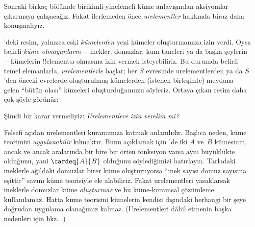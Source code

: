 \documentclass[../../../include/open-logic-section]{subfiles}
\begin{document}

Sonraki birkaç bölümde birikimli-yinelemeli küme anlayışından aksiyomlar
çıkarmaya çalışacağız. Fakat ilerlemeden önce \emph{urelementler} hakkında
biraz daha konuşmalıyız.

'deki resim, yalnızca eski \emph{kümelerden} yeni
kümeler oluşturmamıza izin verdi. Oysa belirli \emph{küme olmayanların}---
inekler, domuzlar, kum taneleri ya da başka şeylerin---kümelerin !!{element}s{}ı
olmasına izin vermek isteyebiliriz. Bu durumda belirli temel elemanlarla,
\emph{urelementlerle} başlar; her $S$ evresinde urelementlerden ya da
$S$'den önceki evrelerde oluşturulmuş kümelerden (istenen birleşimle) meydana
gelen ``bütün olası'' kümeleri oluşturduğumuzu söyleriz. Ortaya çıkan resim
daha çok şöyle görünür:
\begin{center}
\end{center}
Şimdi bir karar vermeliyiz: \emph{Urelementlere izin verelim mi?}

Felsefi açıdan urelementleri kuramımıza katmak anlamlıdır. Başlıca neden,
küme teorimizi \emph{uygulanabilir} kılmaktır. Bunu açıklamak için
'de iki $A$ ve~$B$ kümesinin, ancak ve ancak
aralarında bir bire bir örten fonksiyon varsa aynı büyüklükte olduğunu,
yani $\cardeq{A}{B}$ olduğunu söylediğimizi hatırlayın. Tarladaki ineklerle
ağıldaki domuzlar birer küme oluşturuyorsa ``inek sayısı domuz sayısına
eşittir'' savını küme teorisiyle ele alabiliriz. Fakat urelementleri
yasaklarsak ineklerle domuzlar küme \emph{oluşturmaz} ve bu küme-kuramsal
çözümleme kullanılamaz. Hatta küme teorisini kümelerin kendisi dışındaki
herhangi bir şeye doğrudan uygulama olanağımız kalmaz. (Urelementleri dâhil
etmenin başka nedenleri için bkz. \citealt[pp.~vi, 24, 50--1]{Potter2004}.)
\end{document}
